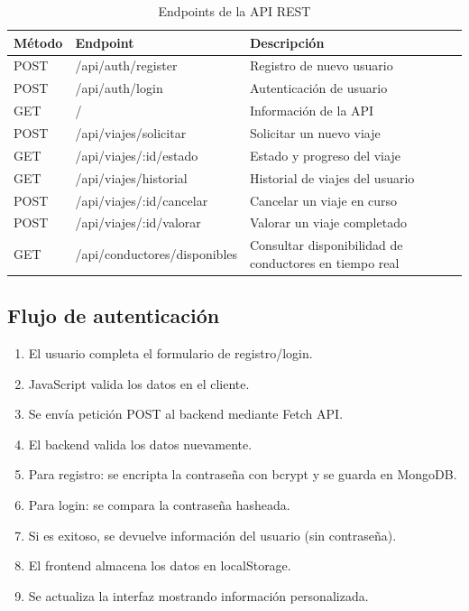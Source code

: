 \documentclass[12pt,a4paper]{article}
\begin{document}
\begin{table}[h]
\centering
\begin{tabular}{|l|l|p{5.5cm}|}
\hline
\textbf{Método} & \textbf{Endpoint} & \textbf{Descripción} \\
\hline
POST & /api/auth/register & Registro de nuevo usuario \\
POST & /api/auth/login & Autenticación de usuario \\
GET  & / & Información de la API \\
\hline
POST & /api/viajes/solicitar & Solicitar un nuevo viaje \\
GET  & /api/viajes/:id/estado & Estado y progreso del viaje \\
GET  & /api/viajes/historial & Historial de viajes del usuario \\
POST & /api/viajes/:id/cancelar & Cancelar un viaje en curso \\
POST & /api/viajes/:id/valorar & Valorar un viaje completado \\
GET  & /api/conductores/disponibles & Consultar disponibilidad de conductores en tiempo real \\
\hline
\end{tabular}
\caption{Endpoints de la API REST}
\end{table}

\subsection{Flujo de autenticación}

\begin{enumerate}
    \item El usuario completa el formulario de registro/login.
    \item JavaScript valida los datos en el cliente.
    \item Se envía petición POST al backend mediante Fetch API.
    \item El backend valida los datos nuevamente.
    \item Para registro: se encripta la contraseña con bcrypt y se guarda en MongoDB.
    \item Para login: se compara la contraseña hasheada.
    \item Si es exitoso, se devuelve información del usuario (sin contraseña).
    \item El frontend almacena los datos en localStorage.
    \item Se actualiza la interfaz mostrando información personalizada.
\end{enumerate}
\end{document}
